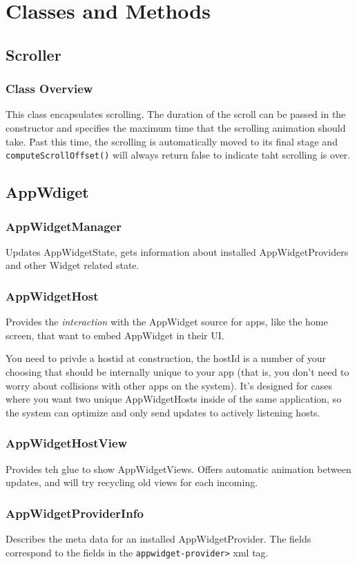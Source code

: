 \documentclass[11pt, a4paper]{book}
\begin{document}
\chapter{Classes and Methods}
\section{Scroller}
\subsection{Class Overview}
This class encapsulates scrolling. The duration of the scroll can be passed
 in the constructor and specifies the maximum time that the scrolling animation
should take. Past this time, the scrolling is automatically moved to its final
stage and \verb|computeScrollOffset()| will always return false to indicate taht
scrolling is over.

\section{AppWdiget}

\subsection{AppWidgetManager}
Updates AppWidgetState, gets information about installed AppWidgetProviders and
other Widget related state.
\subsection{AppWidgetHost}
Provides the \emph{interaction} with the AppWidget source for apps, like the
home screen, that want to embed AppWidget in their UI.

You need to privde a hostid at construction, the hostId is a number of your 
choosing that should be internally unique to your app (that is, you don't 
need to worry about collisions with other apps on the system).  It's designed 
for cases where you want two unique AppWidgetHosts inside of the same 
application, so the system can optimize and only send updates to actively 
listening hosts. 

\subsection{AppWidgetHostView}
Provides teh glue to show AppWidgetViews. Offers automatic animation between
updates, and will try recycling old views for each incoming.
\subsection{AppWidgetProviderInfo}
Describes the meta data for an installed AppWidgetProvider. The fields
correspond to the fields in the \verb|appwidget-provider>| xml tag.
\end{document}

